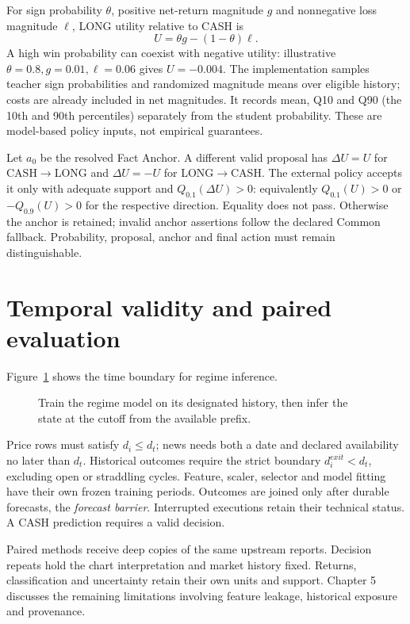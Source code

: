 For sign probability $\theta$, positive net-return magnitude $g$ and
nonnegative loss magnitude $\ell$, LONG utility relative to CASH is
\begin{equation}\label{eq:utility}
U=\theta g-(1-\theta)\ell.
\end{equation}
A high win probability can coexist with negative utility: illustrative
$\theta=0.8,g=0.01,\ell=0.06$ gives $U=-0.004$. The implementation samples
teacher sign probabilities and randomized magnitude means over eligible
history; costs are already included in net magnitudes. It records mean,
Q10 and Q90 (the 10th and 90th percentiles) separately from the student
probability. These are model-based
policy inputs, not empirical guarantees.

Let $a_0$ be the resolved Fact Anchor. A different valid proposal has
$\Delta U=U$ for CASH$\to$LONG and $\Delta U=-U$ for LONG$\to$CASH. The
external policy accepts it only with adequate support and
$Q_{0.1}(\Delta U)>0$: equivalently $Q_{0.1}(U)>0$ or $-Q_{0.9}(U)>0$ for the
respective direction. Equality does not pass. Otherwise the anchor is
retained; invalid anchor assertions follow the declared Common fallback.
Probability, proposal, anchor and final action must remain distinguishable.

\section{Temporal validity and paired evaluation}\label{s:e96c9e0900bb66c1}
Figure~\ref{fig:regime-prefix} shows the time boundary for regime inference.
\begin{figure}[!htb]\centering

\caption[Regime estimation at the cutoff]{Train the regime model on its designated history, then infer the state at the cutoff from the available prefix.}\label{fig:regime-prefix}
\end{figure}

Price rows must satisfy $d_i\le d_t$; news needs both a date and declared
availability no later than $d_t$. Historical outcomes require the strict
boundary $d_i^{exit}<d_t$, excluding open or straddling cycles. Feature,
scaler, selector and model fitting have their own frozen training periods.
Outcomes are joined only after durable forecasts, the \emph{forecast
barrier}. Interrupted executions retain their technical status. A CASH prediction requires a valid decision.

Paired methods receive deep copies of the same upstream reports.
Decision repeats hold the chart interpretation and market history fixed.
Returns, classification and uncertainty retain their own units and
support. Chapter 5 discusses the remaining limitations involving feature
leakage, historical exposure and provenance.
